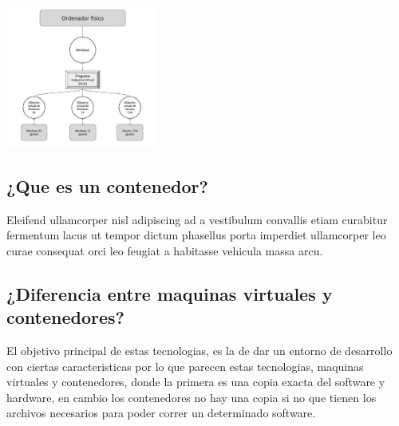 \documentclass[twoside,twocolumn]{article}
\begin{document}
\begin{center}
	\includegraphics[width=5cm]{./Imagenes/virtualizacion} 
	\end{center}



\subsection{¿Que es un contenedor?}
Eleifend ullamcorper nisl adipiscing ad a vestibulum convallis etiam curabitur fermentum lacus ut tempor dictum phasellus porta imperdiet ullamcorper leo curae consequat orci leo feugiat a habitasse vehicula massa arcu.

\subsection{¿Diferencia entre maquinas virtuales y contenedores?}
El objetivo principal de estas tecnologias, es la de dar un entorno de desarrollo con ciertas caracteristicas por lo que parecen estas tecnologias, maquinas virtuales y contenedores, donde la primera es una copia exacta del software y hardware, en cambio los contenedores no hay una copia si no que tienen los archivos necesarios para poder correr un determinado software.
\end{document}

